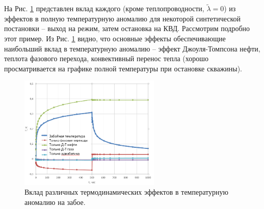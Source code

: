 	На Рис. \ref{pic:effects} представлен вклад каждого (кроме теплопроводности, $\tilde{\lambda}=0$) из эффектов в полную температурную аномалию для некоторой синтетической постановки -- выход на режим, затем остановка на КВД.
	Рассмотрим подробно этот пример.
	Из Рис. \ref{pic:effects} видно, что основные эффекты обеспечивающие наибольший вклад в температурную аномалию -- эффект Джоуля-Томпсона нефти, теплота фазового перехода, конвективный перенос тепла (хорошо просматривается на графике полной температуры при остановке скважины).
\begin{figure}[H]
	\centerline{\includegraphics[width=0.6\textwidth]{pic/effects.png}}
	\caption{Вклад различных термодинамических эффектов в температурную аномалию на забое.}
	\label{pic:effects}
\end{figure}

